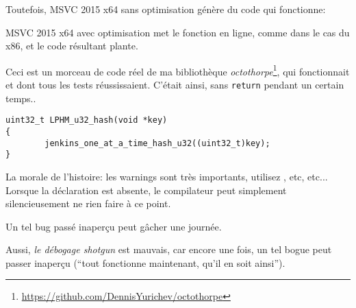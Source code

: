 

Toutefois, MSVC 2015 x64 sans optimisation génère du code qui fonctionne:



MSVC 2015 x64 avec optimisation met le fonction en ligne, comme dans le cas du x86,
et le code résultant plante.

\myhrule{}

Ceci est un morceau de code réel de ma bibliothèque \emph{octothorpe}\footnote{\url{https://github.com/DennisYurichev/octothorpe}},
qui fonctionnait et dont tous les tests réussissaient.
C'était ainsi, sans \verb|return| pendant un certain temps..


\begin{lstlisting}
uint32_t LPHM_u32_hash(void *key)
{
        jenkins_one_at_a_time_hash_u32((uint32_t)key);
}
\end{lstlisting}

\myhrule{}

La morale de l'histoire: les warnings sont très importants, utilisez , etc, etc...
Lorsque la déclaration  est absente, le compilateur peut simplement silencieusement
ne rien faire à ce point.

Un tel bug passé inaperçu peut gâcher une journée.

Aussi, \emph{le débogage shotgun}
est mauvais, car encore une fois, un tel bogue peut passer inaperçu (``tout fonctionne
maintenant, qu'il en soit ainsi'').
